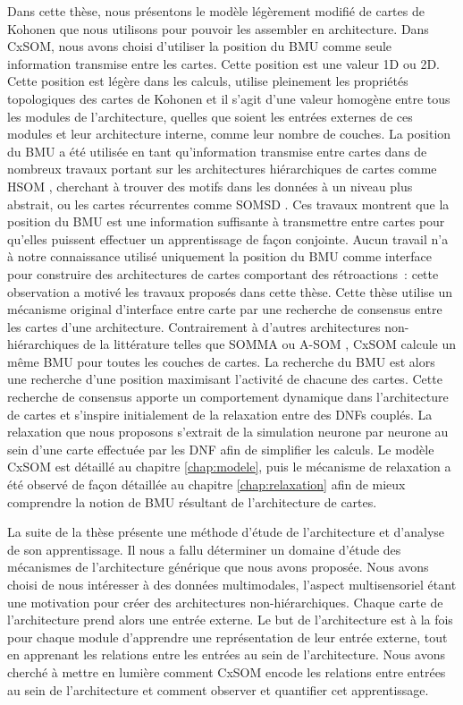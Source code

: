 Dans cette thèse, nous présentons le modèle légèrement modifié de cartes de Kohonen que nous utilisons pour pouvoir les assembler en architecture.
Dans CxSOM, nous avons choisi d'utiliser la position du BMU comme seule information transmise entre les cartes. Cette position est une valeur 1D ou 2D. Cette position est légère dans les calculs, utilise pleinement les propriétés topologiques des cartes de Kohonen et il s'agit d'une valeur homogène entre tous les modules de l'architecture, quelles que soient les entrées externes de ces modules et leur architecture interne, comme leur nombre de couches.
La position du BMU a été utilisée en tant qu'information transmise entre cartes dans de nombreux travaux portant sur les architectures hiérarchiques de cartes comme HSOM \cite{lampinen_clustering_1992}, cherchant à trouver des motifs dans les données à un niveau plus abstrait, ou les cartes récurrentes comme SOMSD \cite{hagenbuchner_self-organizing_2003}. Ces travaux montrent que la position du BMU est une information suffisante à transmettre entre cartes pour qu'elles puissent effectuer un apprentissage de façon conjointe.
Aucun travail n'a à notre connaissance utilisé uniquement la position du BMU comme interface pour construire des architectures de cartes comportant des rétroactions~: cette observation a motivé les travaux proposés dans cette thèse.
Cette thèse utilise un mécanisme original d'interface entre carte par une recherche de consensus entre les cartes d'une architecture. Contrairement à d'autres architectures non-hiérarchiques de la littérature telles que SOMMA \cite{dominey13} ou A-SOM \cite{johnsson_associating_2008}, CxSOM calcule un même BMU pour toutes les couches de cartes. 
La recherche du BMU est alors une recherche d'une position maximisant l'activité de chacune des cartes.
Cette recherche de consensus apporte un comportement dynamique dans l'architecture de cartes et s'inspire initialement de la relaxation entre des DNFs couplés. 
La relaxation que nous proposons s'extrait de la simulation neurone par neurone au sein d'une carte effectuée par les DNF afin de simplifier les calculs. 
Le modèle CxSOM est détaillé au chapitre \ref{chap:modele}, puis le mécanisme de relaxation a été observé de façon détaillée au chapitre \ref{chap:relaxation} afin de mieux comprendre la notion de BMU résultant de l'architecture de cartes.

La suite de la thèse présente une méthode d'étude de l'architecture et d'analyse de son apprentissage.
Il nous a fallu déterminer un domaine d'étude des mécanismes de l'architecture générique que nous avons proposée. Nous avons choisi de nous intéresser à des données multimodales, l'aspect multisensoriel étant une motivation pour créer des architectures non-hiérarchiques. 
Chaque carte de l'architecture prend alors une entrée externe.
Le but de l'architecture est à la fois pour chaque module d'apprendre une représentation de leur entrée externe,  tout en apprenant les relations entre les entrées au sein de l'architecture. 
Nous avons cherché à mettre en lumière comment CxSOM encode les relations entre entrées au sein de l'architecture et comment observer et quantifier cet apprentissage.

